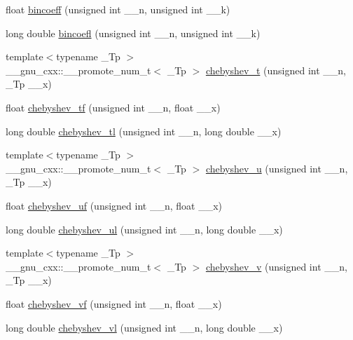 \begin{DoxyCompactItemize}
float \hyperlink{namespace____gnu__cxx_a20ff8c4c82808c78c299634d02f3f8bd}{bincoeff} (unsigned int \+\_\+\+\_\+n, unsigned int \+\_\+\+\_\+k)
\item 
long double \hyperlink{namespace____gnu__cxx_a6874da4660b1ef35c03e28bf09e81796}{bincoefl} (unsigned int \+\_\+\+\_\+n, unsigned int \+\_\+\+\_\+k)
\item 
{\footnotesize template$<$typename \+\_\+\+Tp $>$ }\\\+\_\+\+\_\+gnu\+\_\+cxx\+::\+\_\+\+\_\+promote\+\_\+num\+\_\+t$<$ \+\_\+\+Tp $>$ \hyperlink{namespace____gnu__cxx_ad8769048d3a0eb2adcfcfeaa10af37fe}{chebyshev\+\_\+t} (unsigned int \+\_\+\+\_\+n, \+\_\+\+Tp \+\_\+\+\_\+x)
\item 
float \hyperlink{namespace____gnu__cxx_ab8cdb55702d9c8b85af4ecc3d8c6a134}{chebyshev\+\_\+tf} (unsigned int \+\_\+\+\_\+n, float \+\_\+\+\_\+x)
\item 
long double \hyperlink{namespace____gnu__cxx_a0c421700d244cdf58e3ac5ff267664d1}{chebyshev\+\_\+tl} (unsigned int \+\_\+\+\_\+n, long double \+\_\+\+\_\+x)
\item 
{\footnotesize template$<$typename \+\_\+\+Tp $>$ }\\\+\_\+\+\_\+gnu\+\_\+cxx\+::\+\_\+\+\_\+promote\+\_\+num\+\_\+t$<$ \+\_\+\+Tp $>$ \hyperlink{namespace____gnu__cxx_a59e3a6dd4d614f6e158a0a56fa25a0b1}{chebyshev\+\_\+u} (unsigned int \+\_\+\+\_\+n, \+\_\+\+Tp \+\_\+\+\_\+x)
\item 
float \hyperlink{namespace____gnu__cxx_a4b28c2a079eae2e9612c9902801ca256}{chebyshev\+\_\+uf} (unsigned int \+\_\+\+\_\+n, float \+\_\+\+\_\+x)
\item 
long double \hyperlink{namespace____gnu__cxx_a11ec202d6aacafba1182e962ecf02978}{chebyshev\+\_\+ul} (unsigned int \+\_\+\+\_\+n, long double \+\_\+\+\_\+x)
\item 
{\footnotesize template$<$typename \+\_\+\+Tp $>$ }\\\+\_\+\+\_\+gnu\+\_\+cxx\+::\+\_\+\+\_\+promote\+\_\+num\+\_\+t$<$ \+\_\+\+Tp $>$ \hyperlink{namespace____gnu__cxx_af5e47fa5f24acf2aac6c7a1187ee6be1}{chebyshev\+\_\+v} (unsigned int \+\_\+\+\_\+n, \+\_\+\+Tp \+\_\+\+\_\+x)
\item 
float \hyperlink{namespace____gnu__cxx_aa9635a0da4bdeaa8060ae5cf03c3a12d}{chebyshev\+\_\+vf} (unsigned int \+\_\+\+\_\+n, float \+\_\+\+\_\+x)
\item 
long double \hyperlink{namespace____gnu__cxx_ae387ee1bfcd52555ad4d690f5888a078}{chebyshev\+\_\+vl} (unsigned int \+\_\+\+\_\+n, long double \+\_\+\+\_\+x)

\end{DoxyCompactItemize}

